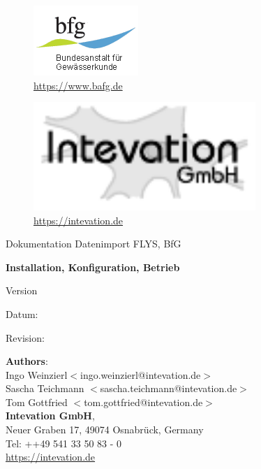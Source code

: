 
\begin{figure}[ht]
  \begin{minipage}[b]{0.5\linewidth}
    \centering
     \includegraphics[scale=0.75]{figures/bfg_logo} \\
     \url{https://www.bafg.de}\\[4.0cm]
  \end{minipage}
  \begin{minipage}[b]{0.5\linewidth}
    \centering
    \includegraphics[width=0.75\textwidth]{figures/intevation-logo}
    \url{https://intevation.de}\\[2.0cm]
  \end{minipage}
\end{figure}

 \vspace{4cm}

 {
 	\sffamily\large
 	Dokumentation Datenimport FLYS, BfG

 	\vspace{1cm}
 	{
 		\bfseries\huge
 		Installation, Konfiguration, Betrieb
 	}

 	\vspace{1cm}
 	Version \documentversion

    Datum: \documentdate

 	Revision: \documentrevision
 }

 \vspace{4cm}

 \thispagestyle{empty}

 \vfill

 \begin{flushleft}
 \textbf{Authors}:\\
 Ingo Weinzierl$<$ingo.weinzierl@intevation.de$>$\\
 Sascha Teichmann $<$sascha.teichmann@intevation.de$>$\\
 Tom Gottfried $<$tom.gottfried@intevation.de$>$\\
 \textbf{Intevation GmbH},\\
 Neuer Graben 17, 49074 Osnabrück, Germany\\
 Tel: ++49 541 33 50 83 - 0 \\
 \url{https://intevation.de}

 \end{flushleft}

